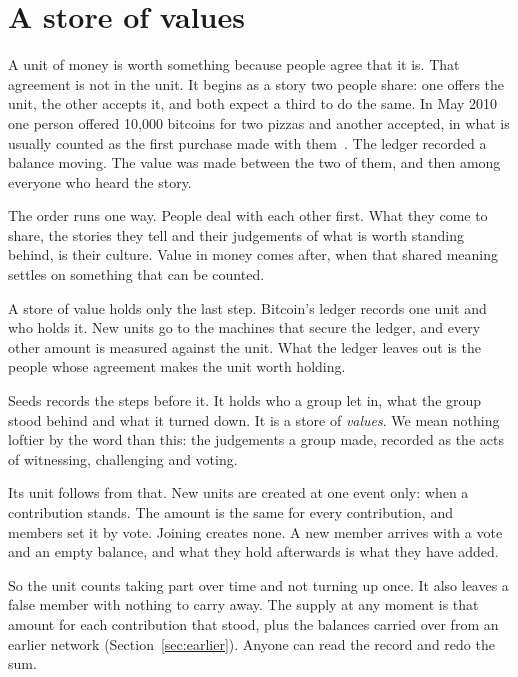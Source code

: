 \documentclass[11pt,a4paper]{article}
\begin{document}
\section{A store of values}
\label{sec:values}

A unit of money is worth something because people agree that it is. That agreement is not in the unit. It begins as a story two people share: one offers the unit, the other accepts it, and both expect a third to do the same. In May 2010 one person offered 10,000 bitcoins for two pizzas and another accepted, in what is usually counted as the first purchase made with them~\cite{pizza}. The ledger recorded a balance moving. The value was made between the two of them, and then among everyone who heard the story.

The order runs one way. People deal with each other first. What they come to share, the stories they tell and their judgements of what is worth standing behind, is their culture. Value in money comes after, when that shared meaning settles on something that can be counted.

A store of value holds only the last step. Bitcoin's ledger records one unit and who holds it. New units go to the machines that secure the ledger, and every other amount is measured against the unit. What the ledger leaves out is the people whose agreement makes the unit worth holding.

Seeds records the steps before it. It holds who a group let in, what the group stood behind and what it turned down. It is a store of \emph{values}. We mean nothing loftier by the word than this: the judgements a group made, recorded as the acts of witnessing, challenging and voting.

Its unit follows from that. New units are created at one event only: when a contribution stands. The amount is the same for every contribution, and members set it by vote. Joining creates none. A new member arrives with a vote and an empty balance, and what they hold afterwards is what they have added.

So the unit counts taking part over time and not turning up once. It also leaves a false member with nothing to carry away. The supply at any moment is that amount for each contribution that stood, plus the balances carried over from an earlier network (Section~\ref{sec:earlier}). Anyone can read the record and redo the sum.
\end{document}
